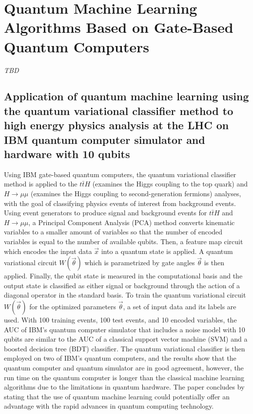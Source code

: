 \section{Quantum Machine Learning Algorithms Based on Gate-Based Quantum Computers}

\textit{TBD}

\subsection{Application of quantum machine learning using the quantum variational classifier method to high energy physics analysis at the LHC on IBM quantum computer simulator and hardware with 10 qubits~\cite{Wu:2020cye}}
Using IBM gate-based quantum computers, the quantum variational classifier method is applied to the $t\bar{t}H$ (examines the Higgs coupling to the top quark) and $H\rightarrow\mu\mu$ (examines the Higgs coupling to second-generation fermions) analyses, with the goal of classifying physics events of interest from background events. Using event generators to produce signal and background events for $t\bar{t}H$ and $H\rightarrow\mu\mu$, a Principal Component Analysis (PCA) method converts kinematic variables to a smaller amount of variables so that the number of encoded variables is equal to the number of available qubits. Then, a feature map circuit which encodes the input data $\vec{x}$ into a quantum state is applied. A quantum variational circuit $W(\vec{\theta})$ which is parametrized by gate angles $\vec{\theta}$ is then applied. Finally, the qubit state is measured in the computational basis and the output state is classified as either signal or background through the action of a diagonal operator in the standard basis. To train the quantum variational circuit $W(\vec{\theta})$ for the optimized parameters $\vec{\theta}$, a set of input data and its labels are used. With 100 training events, 100 test events, and 10 encoded variables, the AUC of IBM's quantum computer simulator that includes a noise model with 10 qubits are similar to the AUC of a classical support vector machine (SVM) and a boosted decision tree (BDT) classifier. The quantum variational classifier is then employed on two of IBM's quantum computers, and the results show that the quantum computer and quantum simulator are in good agreement, however, the run time on the quantum computer is longer than the classical machine learning algorithms due to the limitations in quantum hardware. The paper concludes by stating that the use of quantum machine learning could potentially offer an advantage with the rapid advances in quantum computing technology.
